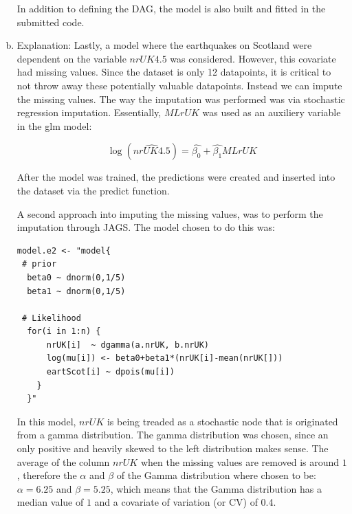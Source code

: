 \documentclass[12pt,a4paper]{article}
\begin{document}
\begin{enumerate}[(a)]
  
In addition to defining the DAG, the model is also built and fitted in the submitted code.

\item
Explanation: Lastly, a model where the earthquakes on Scotland were dependent on the variable $nrUK4.5$ was considered. However, this covariate had missing values. Since the dataset is only 12 datapoints, it is critical to not throw away these potentially valuable datapoints. Instead we can impute the missing values. The way the imputation was performed was via stochastic regression imputation. Essentially, $MLrUK$ was used as an auxiliery variable in the glm model: 

$$\log(\widehat{nrUK4.5})=\widehat{\beta_0}+\widehat{\beta_1}MLrUK$$

After the model was trained, the predictions were created and inserted into the dataset via the predict function.

A second approach into imputing the missing values, was to perform the imputation through JAGS. The model chosen to do this was: 

\begin{verbatim}
model.e2 <- "model{
 # prior
  beta0 ~ dnorm(0,1/5)
  beta1 ~ dnorm(0,1/5)
  
 # Likelihood
  for(i in 1:n) {
      nrUK[i]  ~ dgamma(a.nrUK, b.nrUK)
      log(mu[i]) <- beta0+beta1*(nrUK[i]-mean(nrUK[]))
      eartScot[i] ~ dpois(mu[i])
    } 
  }"
\end{verbatim}

In this model, $nrUK$ is being treaded as a stochastic node that is originated from a gamma distribution. The gamma distribution was chosen, since an only positive and heavily skewed to the left distribution makes sense. The average of the column $nrUK$ when the missing values are removed is around $1$, therefore the $\alpha$ and $\beta$ of the Gamma distribution where chosen to be: $\alpha=6.25$ and $\beta=5.25$, which means that the Gamma distribution has a median value of $1$ and a covariate of variation (or CV) of 0.4. 

\end{enumerate}
\end{document}
